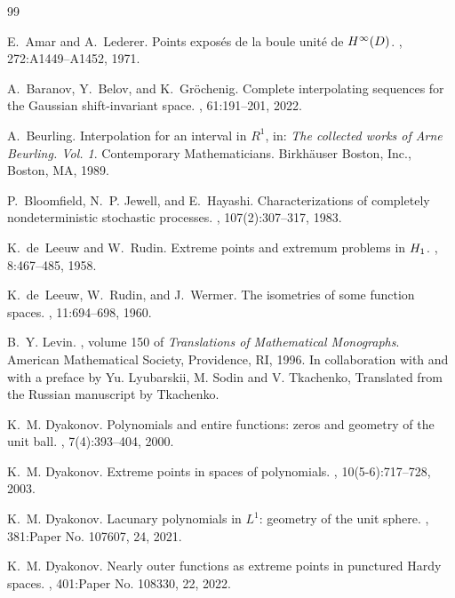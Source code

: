\documentclass[12pt]{amsart}
\numberwithin{equation}{section}
\theoremstyle{plain}
\theoremstyle{definition}
\begin{document}
\begin{thebibliography}{99}

E.~Amar and A.~Lederer.
\newblock Points expos\'es de la boule unit\'e{} de {$H\sp{\infty }(D)$}.
, 272:A1449--A1452, 1971.

A.~Baranov, Y.~Belov, and K.~Gr\"ochenig.
\newblock Complete interpolating sequences for the {G}aussian shift-invariant space.
, 61:191--201, 2022.

A.~Beurling.
\newblock  Interpolation for an interval in {$R^1$}, in: {\em The collected works of {A}rne {B}eurling. {V}ol. 1}.
\newblock Contemporary Mathematicians. Birkh\"auser Boston, Inc., Boston, MA, 1989.

P.~Bloomfield, N.~P. Jewell, and E.~Hayashi.
\newblock Characterizations of completely nondeterministic stochastic processes.
, 107(2):307--317, 1983.

K.~de~Leeuw and W.~Rudin.
\newblock Extreme points and extremum problems in {$H\sb{1}$}.
, 8:467--485, 1958.

K.~de~Leeuw, W.~Rudin, and J.~Wermer.
\newblock The isometries of some function spaces.
, 11:694--698, 1960.

B.~Y. Levin.
, volume 150 of {\em Translations of Mathematical Monographs}.
\newblock American Mathematical Society, Providence, RI, 1996.
\newblock In collaboration with and with a preface by Yu. Lyubarskii, M. Sodin and V. Tkachenko, Translated from the Russian manuscript by Tkachenko.

K.~M. Dyakonov.
\newblock Polynomials and entire functions: zeros and geometry of the unit ball.
, 7(4):393--404, 2000.

K.~M. Dyakonov.
\newblock Extreme points in spaces of polynomials.
, 10(5-6):717--728, 2003.

K.~M. Dyakonov.
\newblock Lacunary polynomials in {$L^1$}: geometry of the unit sphere.
, 381:Paper No. 107607, 24, 2021.

K.~M. Dyakonov.
\newblock Nearly outer functions as extreme points in punctured {H}ardy spaces.
, 401:Paper No. 108330, 22, 2022.


\end{thebibliography}
\end{document}

